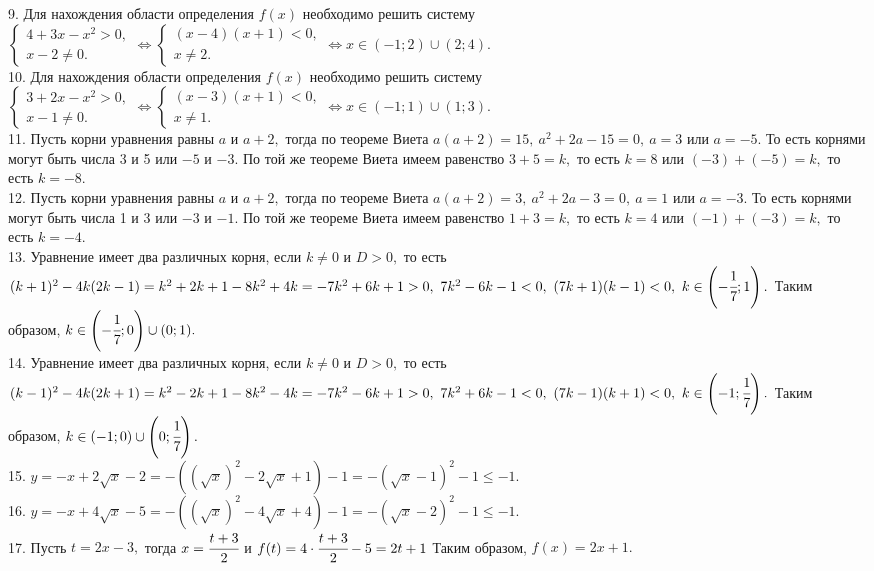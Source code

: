 9. Для нахождения области определения $f(x)$ необходимо решить систему $\begin{cases} 4+3x-x^2>0,\\ x-2\neq0.\end{cases}\Leftrightarrow
\begin{cases} (x-4)(x+1)<0,\\ x\neq2.\end{cases}\Leftrightarrow x\in(-1;2)\cup(2;4).$\\
10. Для нахождения области определения $f(x)$ необходимо решить систему $\begin{cases} 3+2x-x^2>0,\\ x-1\neq0.\end{cases}\Leftrightarrow
\begin{cases} (x-3)(x+1)<0,\\ x\neq1.\end{cases}\Leftrightarrow x\in(-1;1)\cup(1;3).$\\
11. Пусть корни уравнения равны $a$ и $a+2,$ тогда по теореме Виета $a(a+2)=15,\ a^2+2a-15=0,\ a=3$ или $a=-5.$ То есть корнями могут быть числа 3 и 5 или $-5$ и $-3.$ По той же теореме Виета имеем равенство $3+5=k,$ то есть $k=8$ или $(-3)+(-5)=k,$ то есть $k=-8.$\\
12. Пусть корни уравнения равны $a$ и $a+2,$ тогда по теореме Виета $a(a+2)=3,\ a^2+2a-3=0,\ a=1$ или $a=-3.$ То есть корнями могут быть числа 1 и 3 или $-3$ и $-1.$ По той же теореме Виета имеем равенство $1+3=k,$ то есть $k=4$ или $(-1)+(-3)=k,$ то есть $k=-4.$\\
13. Уравнение имеет два различных корня, если $k\neq0$ и $D>0,$ то есть $(k+1)^2-4k(2k-1)=k^2+2k+1-8k^2+4k=-7k^2+6k+1>0,\ 7k^2-6k-1<0,\ (7k+1)(k-1)<0,\ k\in\left(-\cfrac{1}{7};1\right).$ Таким образом, $k\in\left(-\cfrac{1}{7};0\right)\cup(0;1).$\\
14. Уравнение имеет два различных корня, если $k\neq0$ и $D>0,$ то есть $(k-1)^2-4k(2k+1)=k^2-2k+1-8k^2-4k=-7k^2-6k+1>0,\ 7k^2+6k-1<0,\ (7k-1)(k+1)<0,\ k\in\left(-1;\cfrac{1}{7}\right).$ Таким образом, $k\in\left(-1;0\right)\cup\left(0;\cfrac{1}{7}\right).$\\
15. $y=-x+2\sqrt{x}-2=-((\sqrt{x})^2-2\sqrt{x}+1)-1=-(\sqrt{x}-1)^2-1\leqslant-1.$\\
16. $y=-x+4\sqrt{x}-5=-((\sqrt{x})^2-4\sqrt{x}+4)-1=-(\sqrt{x}-2)^2-1\leqslant-1.$\\
17. Пусть $t=2x-3,$ тогда $x=\cfrac{t+3}{2}$ и $f(t)=4\cdot\cfrac{t+3}{2}-5=2t+1$ Таким образом, $f(x)=2x+1.$\\
